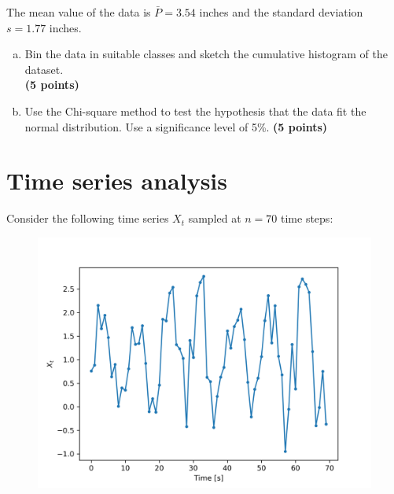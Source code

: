 \documentclass[12pt]{article}
\begin{document}
The mean value of the data is $\bar{P}=3.54$ inches and the standard deviation $s=1.77$ inches.

\begin{enumerate}[(a)] 
\item Bin the data in suitable classes and sketch the cumulative histogram of the dataset. \\ \textbf{\hfill (5 points)}
\item Use the Chi-square method to test the hypothesis that the data fit the normal distribution. Use a significance level of 5\%. \textbf{\hfill (5 points)}
\end{enumerate}



\pagebreak
\section{Time series analysis}
Consider the following time series $X_t$ sampled at $n=70$ time steps:

\begin{figure}[h!]
    \centering
    \includegraphics[width=.8\textwidth]{autocorrelation_y} 
\end{figure}
\end{document}
